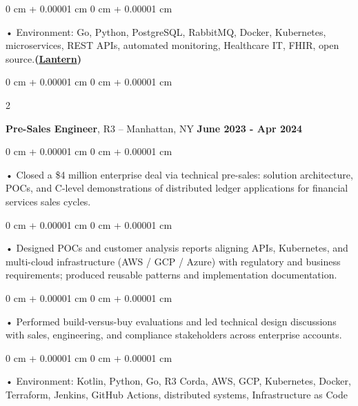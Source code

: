 \documentclass[10pt, letterpaper]{article}
\newenvironment{onecolentry}{
    \begin{adjustwidth}{
        0 cm + 0.00001 cm
    }{
        0 cm + 0.00001 cm
    }
}{
    \end{adjustwidth}
} %
\newenvironment{twocolentry}[2][]{
    \onecolentry
    \def\secondColumn{#2}
    \setcolumnwidth{\fill, 4.5 cm}
    \begin{paracol}{2}
}{
    \switchcolumn \raggedleft \secondColumn
    \end{paracol}
    \endonecolentry
} %
\begin{document}
        \begin{onecolentry}
             • Environment: Go, Python, PostgreSQL, RabbitMQ, Docker, Kubernetes, microservices, REST APIs, automated monitoring, Healthcare IT, FHIR, open source.\textbf{(\href{https://lantern.healthit.gov/?tab=dashboard_tab}{Lantern})}
        \end{onecolentry}
        \vspace{0.1cm}

        \begin{twocolentry}{
            \textbf{June 2023 - Apr 2024}
        }
            \textbf{Pre-Sales Engineer}, R3 -- Manhattan, NY\end{twocolentry}


        \begin{onecolentry}
             • Closed a \$4 million enterprise deal via technical pre-sales: solution architecture, POCs, and C-level demonstrations of distributed ledger applications for financial services sales cycles.
        \end{onecolentry}
        \begin{onecolentry}
             • Designed POCs and customer analysis reports aligning APIs, Kubernetes, and multi-cloud infrastructure (AWS / GCP / Azure) with regulatory and business requirements; produced reusable patterns and implementation documentation.
        \end{onecolentry}
        \begin{onecolentry}
             • Performed build-versus-buy evaluations and led technical design discussions with sales, engineering, and compliance stakeholders across enterprise accounts.
        \end{onecolentry}
        \begin{onecolentry}
             • Environment: Kotlin, Python, Go, R3 Corda, AWS, GCP, Kubernetes, Docker, Terraform, Jenkins, GitHub Actions, distributed systems, Infrastructure as Code
        \end{onecolentry}
        \vspace{0.1cm}
\end{document}
